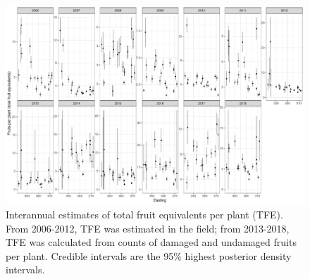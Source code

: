 \documentclass[12pt, oneside]{article}   	%
\begin{document}
 \begin{figure}[!h]
   \centering
       \includegraphics[page=1,width=\textwidth]{../../figures/spatialTFEfull.pdf}  
    \caption{ Interannual estimates of total fruit equivalents per plant (TFE). From 2006-2012, TFE was estimated in the field; from 2013-2018, TFE was calculated from counts of damaged and undamaged fruits per plant. Credible intervals are the 95\% highest posterior density intervals. }
 \label{fig:viability-estimates-population}
\end{figure}
\end{document}

